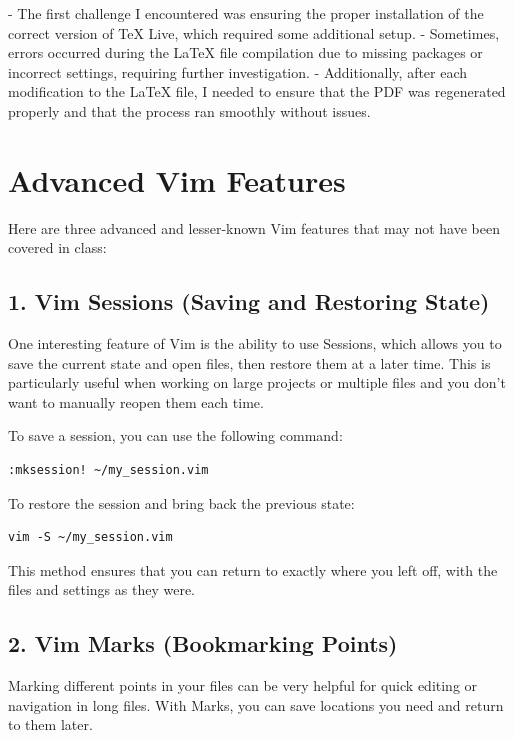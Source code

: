 \documentclass{article}
\begin{document}
- The first challenge I encountered was ensuring the proper installation of the correct version of TeX Live, which required some additional setup.
- Sometimes, errors occurred during the LaTeX file compilation due to missing packages or incorrect settings, requiring further investigation.
- Additionally, after each modification to the LaTeX file, I needed to ensure that the PDF was regenerated properly and that the process ran smoothly without issues.









\section*{Advanced Vim Features}

Here are three advanced and lesser-known Vim features that may not have been covered in class:

\subsection*{1. Vim Sessions (Saving and Restoring State)}
One interesting feature of Vim is the ability to use Sessions, which allows you to save the current state and open files, then restore them at a later time. This is particularly useful when working on large projects or multiple files and you don't want to manually reopen them each time.

To save a session, you can use the following command:
\begin{verbatim}
:mksession! ~/my_session.vim
\end{verbatim}

To restore the session and bring back the previous state:
\begin{verbatim}
vim -S ~/my_session.vim
\end{verbatim}

This method ensures that you can return to exactly where you left off, with the files and settings as they were.

\subsection*{2. Vim Marks (Bookmarking Points)}
Marking different points in your files can be very helpful for quick editing or navigation in long files. With Marks, you can save locations you need and return to them later.
\end{document}
